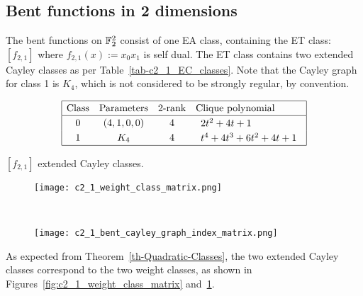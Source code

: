 \subsection{Bent functions in 2 dimensions}
%
The bent functions on $\mathbb{F}_2^2$ consist of one EA class, containing the ET class: $[f_{2,1}]$
where $f_{2,1}(x) := x_0 x_1$ is self dual.
The ET class contains two extended Cayley classes as per Table~\ref{tab-c2_1_EC_classes}.
Note that the Cayley graph for class 1 is $K_4$, which is not considered to be strongly regular, by convention.
\begin{table}[!bhpt] %
\small{
\begin{align*}
\def\arraystretch{1.2}
\begin{array}{|cccl|}
\hline
\text{Class} &
\text{Parameters} &
\text{2-rank} &
\text{Clique polynomial}
\\
\hline
0 &
(4, 1, 0, 0) &
4 &
\begin{array}{l}
2t^{2} + 4t + 1
\end{array}
\\
1 &
K_4 &
4 &
\begin{array}{l}
t^{4} + 4t^{3} + 6t^{2} + 4t + 1
\end{array}
\\
\hline
\end{array}
\end{align*}
}
\caption{$[f_{2,1}]$ extended Cayley classes.}
\label{tab-c2_1_EC_classes}
\end{table}

\begin{figure}[!ht]
\centering
\begin{minipage}{.48\textwidth}
  \centering
  \texttt{[image: c2\_1\_weight\_class\_matrix.png]}
  \label{fig:c2_1_weight_class_matrix}
\end{minipage}%
~~~~
\begin{minipage}{.48\textwidth}
  \centering
  \texttt{[image: c2\_1\_bent\_cayley\_graph\_index\_matrix.png]}
  \label{fig:c2_1_bent_cayley_graph_index_matrix}
\end{minipage}
\end{figure}
As expected from Theorem~\ref{th-Quadratic-Classes},
the two extended Cayley classes correspond to the two weight classes,
as shown in Figures~\ref{fig:c2_1_weight_class_matrix} and~\ref{fig:c2_1_bent_cayley_graph_index_matrix}.

